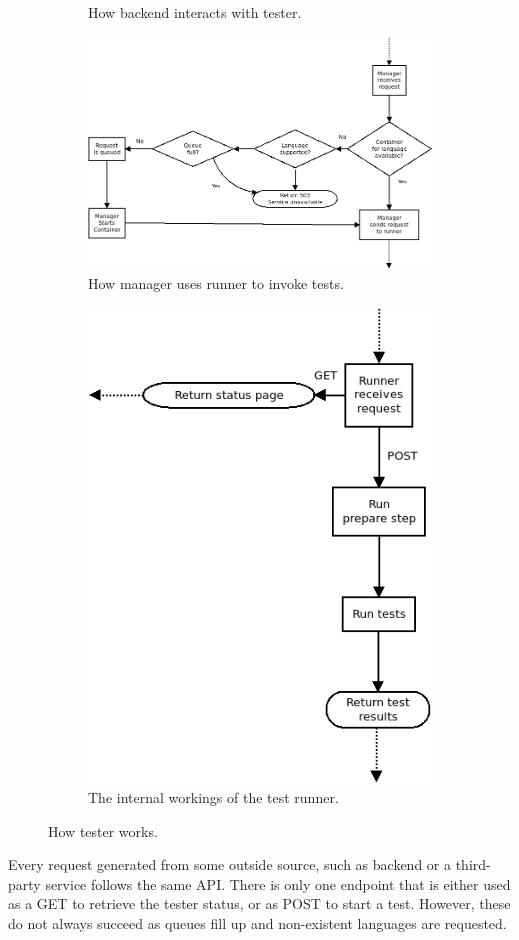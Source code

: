 \begin{figure}
\begin{subfigure}{.35\linewidth}
    \caption{How backend interacts with tester.}
    \end{subfigure}
    \begin{subfigure}{.55\linewidth}
    \centering
    \includegraphics[width=.9\linewidth]{img/manager_usage.png}
    \caption{How manager uses runner to invoke tests.}
    \end{subfigure}

    \begin{subfigure}{.6\linewidth}
    \centering
    \includegraphics[width=.7\linewidth]{img/runner_usage.png}
    \caption{The internal workings of the test runner.}
    \end{subfigure}

    \caption{How tester works.}\label{fig:tester_internals}
\end{figure}
Every request generated from some outside source, such as backend or a third-party service follows the same API. There is only one endpoint that is either used as a GET to retrieve the tester status, or as POST to start a test. However, these do not always succeed as queues fill up and non-existent languages are requested. 
